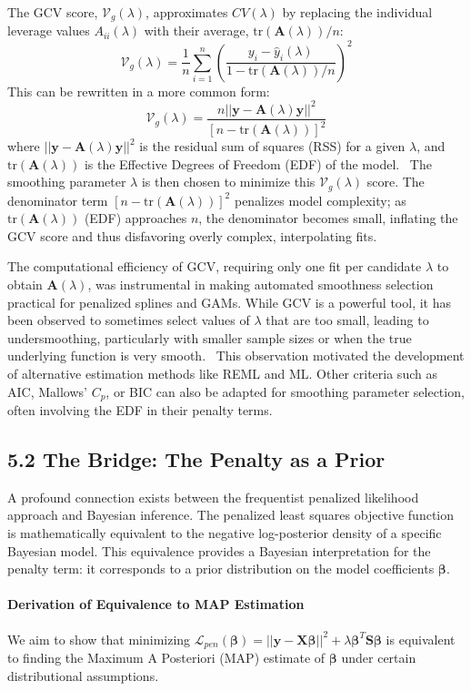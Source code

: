 \documentclass[11pt, a4paper]{article}
\begin{document}
\begin{itemize}
The GCV score, $\mathcal{V}_g(\lambda)$, approximates $CV(\lambda)$ by replacing the individual leverage values $A_{ii}(\lambda)$ with their average, $\text{tr}(\mathbf{A}(\lambda))/n$:
\[ \mathcal{V}_g(\lambda) = \frac{1}{n} \sum_{i=1}^n \left( \frac{y_i - \hat{y}_i(\lambda)}{1 - \text{tr}(\mathbf{A}(\lambda))/n} \right)^2 \]
This can be rewritten in a more common form:
\[ \mathcal{V}_g(\lambda) = \frac{n ||\mathbf{y} - \mathbf{A}(\lambda)\mathbf{y}||^2}{[n - \text{tr}(\mathbf{A}(\lambda))]^2} \]
where $||\mathbf{y} - \mathbf{A}(\lambda)\mathbf{y}||^2$ is the residual sum of squares (RSS) for a given $\lambda$, and $\text{tr}(\mathbf{A}(\lambda))$ is the Effective Degrees of Freedom (EDF) of the model.  The smoothing parameter $\lambda$ is then chosen to minimize this $\mathcal{V}_g(\lambda)$ score. The denominator term $[n - \text{tr}(\mathbf{A}(\lambda))]^2$ penalizes model complexity; as $\text{tr}(\mathbf{A}(\lambda))$ (EDF) approaches $n$, the denominator becomes small, inflating the GCV score and thus disfavoring overly complex, interpolating fits.

The computational efficiency of GCV, requiring only one fit per candidate $\lambda$ to obtain $\mathbf{A}(\lambda)$, was instrumental in making automated smoothness selection practical for penalized splines and GAMs. While GCV is a powerful tool, it has been observed to sometimes select values of $\lambda$ that are too small, leading to undersmoothing, particularly with smaller sample sizes or when the true underlying function is very smooth.  This observation motivated the development of alternative estimation methods like REML and ML. Other criteria such as AIC, Mallows' $C_p$, or BIC can also be adapted for smoothing parameter selection, often involving the EDF in their penalty terms.

\subsection{5.2 The Bridge: The Penalty as a Prior}
A profound connection exists between the frequentist penalized likelihood approach and Bayesian inference. The penalized least squares objective function is mathematically equivalent to the negative log-posterior density of a specific Bayesian model. This equivalence provides a Bayesian interpretation for the penalty term: it corresponds to a prior distribution on the model coefficients $\boldsymbol{\beta}$.

\paragraph{Derivation of Equivalence to MAP Estimation}
We aim to show that minimizing $\mathcal{L}_{pen}(\boldsymbol{\beta}) = ||\mathbf{y} - \mathbf{X}\boldsymbol{\beta}||^2 + \lambda \boldsymbol{\beta}^T \mathbf{S} \boldsymbol{\beta}$ is equivalent to finding the Maximum A Posteriori (MAP) estimate of $\boldsymbol{\beta}$ under certain distributional assumptions.


\end{itemize}
\end{document}

